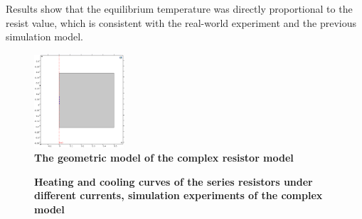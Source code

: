 \documentclass[10pt,a4paper,twocolumn,twoside,UTF8]{article}
\begin{document}
	Results show that the equilibrium temperature was directly proportional to the resist value, which is consistent with the real-world experiment and the previous simulation model.

	\begin{figure}[htbp]
		\centering
		\includegraphics[width=0.3\textwidth]{attachments/fig.1.3.0.png}
		\caption{\textbf{The geometric model of the complex resistor model}}
		\label{fig.1.3.0}
	\end{figure}
	
	\begin{figure}[htbp]
		\centering

		\caption{\textbf{Heating and cooling curves of the series resistors under different currents, simulation experiments of the complex model}}
		\label{fig.1.3.1}
	\end{figure}
\end{document}
